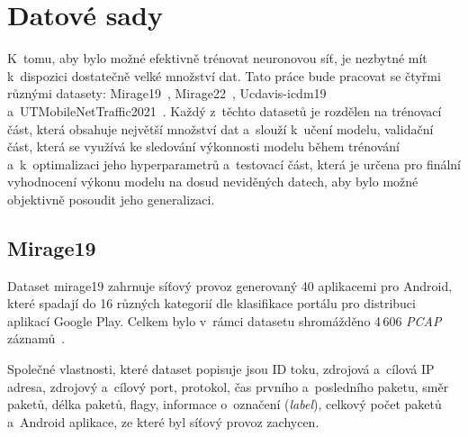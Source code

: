 \section{Datové sady}
\label{datasets}
K~tomu, aby bylo možné efektivně trénovat neuronovou síť, je nezbytné mít k~dispozici dostatečně velké množství dat. Tato práce bude pracovat se čtyřmi různými datasety: Mirage19~\cite{mirage19}, Mirage22~\cite{mirage22}, Ucdavis-icdm19~\cite{usdavis} a~UTMobileNetTraffic2021~\cite{UTMobileNetTraffic}. Každý z~těchto datasetů je rozdělen na trénovací část, která obsahuje největší množství dat a~slouží k~učení modelu, validační část, která se využívá ke sledování výkonnosti modelu během trénování a~k~optimalizaci jeho hyperparametrů a~testovací část, která je určena pro finální vyhodnocení výkonu modelu na dosud neviděných datech, aby bylo možné objektivně posoudit jeho generalizaci.

\subsection{Mirage19}
\label{mirage19_sekce}
Dataset mirage19 zahrnuje síťový provoz generovaný 40 aplikacemi pro Android, které spadají do 16 různých kategorií dle klasifikace portálu pro distribuci aplikací Google Play. Celkem bylo v~rámci datasetu shromážděno 4\,606 \textit{PCAP} záznamů~\cite{mirage19}.

Společné vlastnosti, které dataset popisuje jsou ID toku, zdrojová a~cílová IP adresa, zdrojový a~cílový port, protokol, čas prvního a~posledního paketu, směr paketů, délka paketů, flagy, informace o~označení (\textit{label}), celkový počet paketů a~Android aplikace, ze které byl síťový provoz zachycen.

\begin{table}[H]
    \centering
    \caption{Analýza datové sady Mirage19 bez filtru.}
    \label{mirage19_no_filter}
\end{table}

